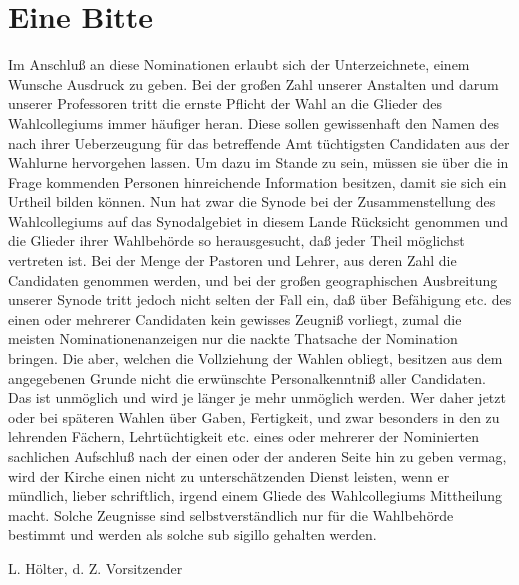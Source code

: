 \chapter{Eine Bitte}

Im Anschluß an diese Nominationen erlaubt sich der Unterzeichnete, einem Wunsche Ausdruck zu geben. Bei der großen Zahl unserer Anstalten und darum unserer Professoren tritt die ernste Pflicht der Wahl an die Glieder des Wahlcollegiums immer häufiger heran. Diese sollen gewissenhaft den Namen des nach ihrer Ueberzeugung für das betreffende Amt tüchtigsten Candidaten aus der Wahlurne hervorgehen lassen. Um dazu im Stande zu sein, müssen sie über die in Frage kommenden Personen hinreichende Information besitzen, damit sie sich ein Urtheil bilden können. Nun hat zwar die Synode bei der Zusammenstellung des Wahlcollegiums auf das Synodalgebiet in diesem Lande Rücksicht genommen und die Glieder ihrer Wahlbehörde so herausgesucht, daß jeder Theil möglichst vertreten ist. Bei der Menge der Pastoren und Lehrer, aus deren Zahl die Candidaten genommen werden, und bei der großen geographischen Ausbreitung unserer Synode tritt jedoch nicht selten der Fall ein, daß über Befähigung etc. des einen oder mehrerer Candidaten kein gewisses Zeugniß vorliegt, zumal die meisten Nominationenanzeigen nur die nackte Thatsache der Nomination bringen. Die aber, welchen die Vollziehung der Wahlen obliegt, besitzen aus dem angegebenen Grunde nicht die erwünschte Personalkenntniß aller Candidaten. Das ist unmöglich und wird je länger je mehr unmöglich werden. Wer daher jetzt oder bei späteren Wahlen über Gaben, Fertigkeit, und zwar besonders in den zu lehrenden Fächern, Lehrtüchtigkeit etc. eines oder mehrerer der Nominierten sachlichen Aufschluß nach der einen oder der anderen Seite hin zu geben vermag, wird der Kirche einen nicht zu unterschätzenden Dienst leisten, wenn er mündlich, lieber schriftlich, irgend einem Gliede des Wahlcollegiums Mittheilung macht. Solche Zeugnisse sind selbstverständlich nur für die Wahlbehörde bestimmt und werden als solche sub sigillo gehalten werden.

\begin{unterschrift}
L. Hölter, d. Z. Vorsitzender
\end{unterschrift}
